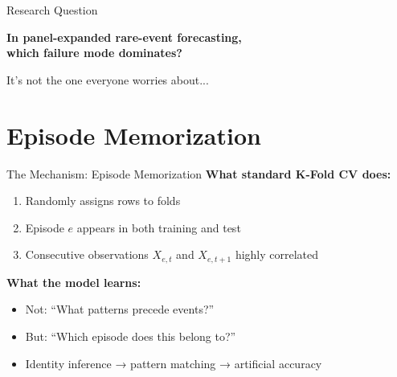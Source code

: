 \documentclass[aspectratio=169]{beamer}
\begin{document}
\begin{frame}{Research Question}
\begin{center}
\LARGE
\textbf{In panel-expanded rare-event forecasting,}\\[0.5em]
\textbf{which failure mode dominates?}

\vspace{2em}
\large
{} It's not the one everyone worries about...
\end{center}
\end{frame}

\section{Episode Memorization}

\begin{frame}{The Mechanism: Episode Memorization}
\textbf{What standard K-Fold CV does:}
\begin{enumerate}
\item Randomly assigns \alert{rows} to folds
\item Episode $e$ appears in \alert{both} training and test
\item Consecutive observations $X_{e,t}$ and $X_{e,t+1}$ highly correlated
\end{enumerate}

\vspace{1em}
\textbf{What the model learns:}
\begin{itemize}
\item Not: ``What patterns precede events?''
\item But: \alert{``Which episode does this belong to?''}
\item Identity inference → pattern matching → artificial accuracy
\end{itemize}

\vspace{1em}
\begin{center}
\end{center}
\end{frame}
\end{document}
